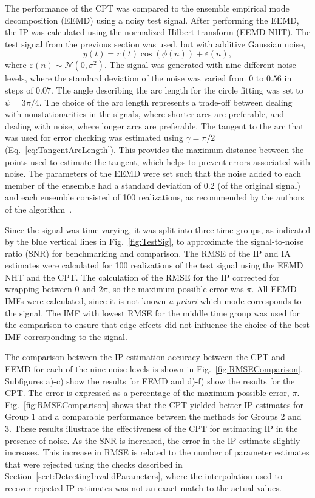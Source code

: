 \documentclass[a4paper]{IEEEtran}
\begin{document}
The performance of the CPT was compared to the ensemble empirical mode decomposition (EEMD) using a noisy test signal. After performing the EEMD, the IP was calculated using the normalized Hilbert transform (EEMD NHT). The test signal from the previous section was used, but with additive Gaussian noise,
\begin{equation}
    y(t)=r\left(t\right)\cos\left(\phi\left(n\right)\right) + \varepsilon \left( n \right),
\end{equation}
where $\varepsilon(n) \sim \mathcal{N}(0,\sigma^2)$. The signal was generated with nine different noise levels, where the standard deviation of the noise was varied from $0$ to $0.56$ in steps of $0.07$. The angle describing the arc length for the circle fitting was set to $\psi=3\pi/4$. The choice of the arc length represents a trade-off between dealing with nonstationarities in the signals, where shorter arcs are preferable, and dealing with noise, where longer arcs are preferable. The tangent to the arc that was used for error checking was estimated using $\gamma = \pi/2$ (Eq.~\ref{eq:TangentArcLength}). This provides the maximum distance between the points used to estimate the tangent, which helps to prevent errors associated with noise. The parameters of the EEMD were set such that the noise added to each member of the ensemble had a standard deviation of 0.2 (of the original signal) and each ensemble consisted of 100 realizations, as recommended by the authors of the algorithm~\cite{Wu2009}. 

Since the signal was time-varying, it was split into three time groups, as indicated by the blue vertical lines in Fig.~\ref{fig:TestSig}, to approximate the signal-to-noise ratio (SNR) for benchmarking and comparison. The RMSE of the IP and IA estimates were calculated for 100 realizations of the test signal using the EEMD NHT and the CPT. The calculation of the RMSE for the IP corrected for wrapping between $0$ and $2\pi$, so the maximum possible error was $\pi$. All EEMD IMFs were calculated, since it is not known \emph{a priori} which mode corresponds to the signal. The IMF with lowest RMSE for the middle time group was used for the comparison to ensure that edge effects did not influence the choice of the best IMF corresponding to the signal. 

The comparison between the IP estimation accuracy between the CPT and EEMD for each of the nine noise levels is shown in Fig.~\ref{fig:RMSEComparison}. Subfigures a)-c) show the results for EEMD and d)-f) show the results for the CPT. The error is expressed as a percentage of the maximum possible error, $\pi$. Fig.~\ref{fig:RMSEComparison} shows that the CPT yielded better IP estimates for Group 1 and a comparable performance between the methods for Groups 2 and 3. These results illustrate the effectiveness of the CPT for estimating IP in the presence of noise. As the SNR is increased, the error in the IP estimate slightly increases. This increase in RMSE is related to the number of parameter estimates that were rejected using the checks described in Section~\ref{sect:DetectingInvalidParameters}, where the interpolation used to recover rejected IP estimates was not an exact match to the actual values.
\end{document}

